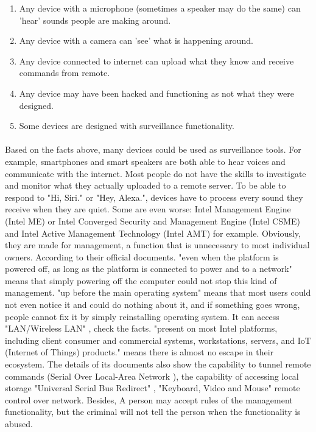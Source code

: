 \documentclass[mscthesis]{usiinfthesis}
\begin{document}
\begin{itemlist}[H]
  \begin{enumerate}
    \item Any device with a microphone (sometimes a speaker may do the same) can 'hear' sounds people are making around.
    \item Any device with a camera can 'see' what is happening around.
    \item Any device connected to internet can upload what they know and receive commands from remote.
    \item Any device may have been hacked and functioning as not what they were designed.
    \item Some devices are designed with surveillance functionality.
  \end{enumerate}
\end{itemlist}

\paragraph{}
Based on the facts above, many devices could be used as surveillance tools. For example, smartphones and smart speakers are both able to hear voices and communicate with the internet. Most people do not have the skills to investigate and monitor what they actually uploaded to a remote server. To be able to respond to "Hi, Siri." or "Hey, Alexa.", devices have to process every sound they receive when they are quiet. Some are even worse: Intel Management Engine (Intel ME) or Intel Converged Security and Management Engine (Intel CSME) and Intel Active Management Technology (Intel AMT) for example. Obviously, they are made for management, a function that is unnecessary to most individual owners. According to their official documents. "even when the platform is powered off, as long as the platform is connected to power and to a network" \citep{ime:csmewp} means that simply powering off the computer could not stop this kind of management. "up before the main operating system" \citep{ime:power} means that most users could not even notice it and could do nothing about it, and if something goes wrong, people cannot fix it by simply reinstalling operating system. It can access "LAN/Wireless LAN" \citep{ime:csmewp}, check the facts. "present on most Intel platforms, including client consumer and commercial systems, workstations, servers, and IoT (Internet of Things) products." \citep{ime:csmewp} means there is almost no escape in their ecosystem. The details of its documents also show the capability to tunnel remote commands (Serial Over Local-Area Network \citep{ime:csmewp}), the capability of accessing local storage "Universal Serial Bus Redirect" \citep{ime:csmewp}, "Keyboard, Video and Mouse" \citep{ime:csmewp} remote control over network. Besides, A person may accept rules of the management functionality, but the criminal will not tell the person when the functionality is abused.
\end{document}
